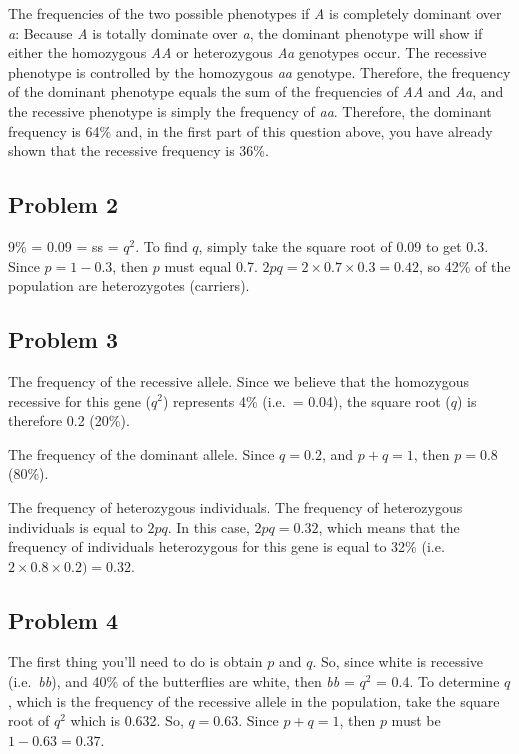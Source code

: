 \documentclass[
  a4paper]{book}
\begin{document}
The frequencies of the two possible phenotypes if \emph{A} is completely dominant over \emph{a}: Because \emph{A} is totally dominate over \emph{a}, the dominant phenotype will show if either the homozygous \emph{AA} or heterozygous \emph{Aa} genotypes occur. The recessive phenotype is controlled by the homozygous \emph{aa} genotype. Therefore, the frequency of the dominant phenotype equals the sum of the frequencies of \emph{AA} and \emph{Aa}, and the recessive phenotype is simply the frequency of \emph{aa}. Therefore, the dominant frequency is 64\% and, in the first part of this question above, you have already shown that the recessive frequency is 36\%.

\subsection{Problem 2}\label{problem-2}

9\% = 0.09 = ss = \(q^2\). To find \(q\), simply take the square root of 0.09 to get 0.3. Since \(p = 1 - 0.3\), then \(p\) must equal 0.7. \(2pq = 2 \times 0.7 \times 0.3 = 0.42\), so 42\% of the population are heterozygotes (carriers).

\subsection{Problem 3}\label{problem-3}

The frequency of the recessive allele. Since we believe that the homozygous recessive for this gene (\(q^2\)) represents 4\% (i.e.~= 0.04), the square root (\(q\)) is therefore 0.2 (20\%).

The frequency of the dominant allele. Since \(q = 0.2\), and \(p + q = 1\), then \(p = 0.8\) (80\%).

The frequency of heterozygous individuals. The frequency of heterozygous individuals is equal to \(2pq\). In this case, \(2pq = 0.32\), which means that the frequency of individuals heterozygous for this gene is equal to 32\% (i.e.~\(2 \times 0.8 \times 0.2) = 0.32\).

\subsection{Problem 4}\label{problem-4}

The first thing you'll need to do is obtain \(p\) and \(q\). So, since white is recessive (i.e.~\emph{bb}), and 40\% of the butterflies are white, then \emph{bb} = \(q^2\) = 0.4.
To determine \(q\), which is the frequency of the recessive allele in the population, take the square root of \(q^2\) which is 0.632. So, \(q = 0.63\). Since \(p + q = 1\), then \(p\) must be \(1 - 0.63 = 0.37\).
\end{document}
